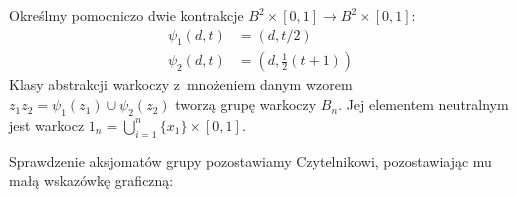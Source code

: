 \begin{definition}
%
    Określmy pomocniczo dwie kontrakcje $B^2 \times [0,1] \to B^2 \times [0,1]$:
    \begin{align*}
        \psi_1(d, t)&  = (d, t/2) \\
        \psi_2(d, t)&  = (d, \frac12 (t+1))
    \end{align*}
    Klasy abstrakcji warkoczy z~mnożeniem danym wzorem $z_1z_2 = \psi_1(z_1) \cup \psi_2(z_2)$ tworzą grupę warkoczy $B_n$.
    Jej elementem neutralnym jest warkocz $1_n = \bigcup_{i = 1}^n \{x_1\} \times [0,1]$.
\end{definition}

Sprawdzenie aksjomatów grupy pozostawiamy Czytelnikowi,
pozostawiając mu małą wskazówkę graficzną:
\begin{comment}
\[
    \begin{tikzpicture}[baseline=-0.65ex, scale=0.2]
    \begin{knot}[clip width=5, end tolerance=1pt]
        \strand[semithick] (-6, 0) .. controls (-4, 0) and (-5, 2) .. (-3, 2);
        \strand[semithick] (-6, 2) .. controls (-4, 2) and (-5, 0) .. (-3, 0);
        \strand[semithick] (-6, -2) to (-3, -2);
        \strand[semithick] (-3, 0) .. controls (-1, 0) and (-2, -2) .. (0, -2);
        \strand[semithick] (-3, -2) .. controls (-1, -2) and (-2, 0) .. (0, 0);
        \strand[semithick] (-3, 2) to (0, 2);
        \strand[semithick] (+6, 0) .. controls (+4, 0) and (+5, 2) .. (+3, 2);
        \strand[semithick] (+6, 2) .. controls (+4, 2) and (+5, 0) .. (+3, 0);
        \strand[semithick] (+6, -2) to (+3, -2);
        \strand[semithick] (+3, 0) .. controls (+1, 0) and (+2, -2) .. (0, -2);
        \strand[semithick] (+3, -2) .. controls (+1, -2) and (+2, 0) .. (0, 0);
        \strand[semithick] (+3, 2) to (0, 2);
        \draw (+6, -3) rectangle (0, 3);
        \draw (-6, -3) rectangle (0, 3);
        \draw[semithick, decoration={brace,mirror,raise=3pt},decorate]  (-5.75, -3) -- node[below=6pt] {$\beta$} (-0.25, -3);
        \draw[semithick, decoration={brace,mirror,raise=3pt},decorate]  (0.25, -3) -- node[below=6pt] {$\beta^{-1}$} (5.75, -3);
    \end{knot}
    \end{tikzpicture}
    \cong
    \begin{tikzpicture}[baseline=-0.65ex, scale=0.2]
        \draw[semithick] (-3, -2) to (3, -2);
        \draw[semithick] (-3, 0) to (3, 0);
        \draw[semithick] (-3, 2) to (3, 2);
        \draw (-3, -3) rectangle (3, 3);

\end{comment}

